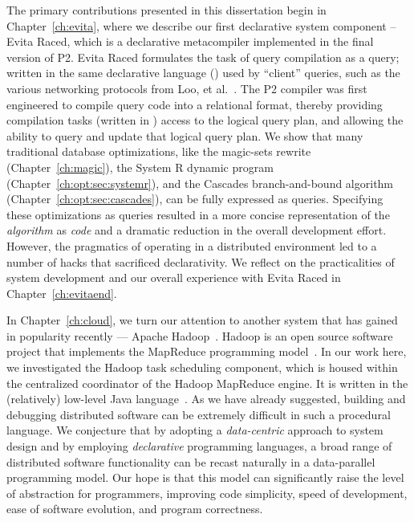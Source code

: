 The primary contributions presented in this dissertation begin in
Chapter~\ref{ch:evita}, where we describe our first declarative system
component -- Evita Raced, which is a declarative metacompiler implemented in
the final version of P2.  Evita Raced formulates the task of query compilation
as a query; written in the same declarative language (\OVERLOG) used by
``client'' queries, such as the various networking protocols from Loo, et
al.~\cite{loo-sigmod06, p2:sosp}.  The P2 compiler was first engineered to
compile query code into a relational format, thereby providing compilation
tasks (written in \OVERLOG) access to the logical query plan, and allowing the
ability to query and update that logical query plan.  We show that many
traditional database optimizations, like the magic-sets rewrite
(Chapter~\ref{ch:magic}), the System R dynamic program
(Chapter~\ref{ch:opt:sec:systemr}), and the Cascades branch-and-bound algorithm
(Chapter~\ref{ch:opt:sec:cascades}), can be fully expressed as \OVERLOG
queries.  Specifying these optimizations as \OVERLOG queries resulted in a more
concise representation of the {\em algorithm} as {\em code} and a dramatic
reduction in the overall development effort.  However, the pragmatics of
operating in a distributed environment led to a number of hacks that sacrificed
declarativity.  We reflect on the practicalities of system development and our
overall experience with Evita Raced in Chapter~\ref{ch:evitaend}.
 
In Chapter~\ref{ch:cloud}, we turn our attention to another system that has
gained in popularity recently --- Apache Hadoop~\cite{hadoop}.  Hadoop is an
open source software project that implements the MapReduce programming
model~\cite{mapreduce-osdi}.  In our work here, we investigated the Hadoop task
scheduling component, which is housed within the centralized coordinator of the
Hadoop MapReduce engine.  It is written in the (relatively) low-level Java
language~\cite{java}.  As we have already suggested, building and debugging
distributed software can be extremely difficult in such a procedural language.  We
conjecture that by adopting a {\em data-centric} approach to system design and
by employing {\em declarative} programming languages, a broad range of
distributed software functionality can be recast naturally in a data-parallel
programming model.  Our hope is that this model can significantly raise the
level of abstraction for programmers, improving code simplicity, speed of
development, ease of software evolution, and program correctness.

